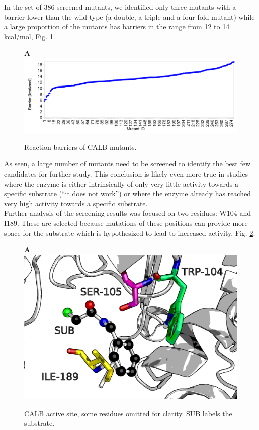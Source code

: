 In the set of 386 screened mutants, we identified only three mutants with a barrier lower than the wild type (a double, a triple and a four-fold mutant) while a large proportion of the mutants has barriers in the range from 12 to 14 kcal/mol, Fig. \ref{fig:reaction-barriers}.
\begin{figure}[htbp] 
\textbf{A}
\includegraphics[width=0.95\linewidth]{barriers.pdf}
\caption{
Reaction barriers of CALB mutants.
}
\label{fig:reaction-barriers}
\end{figure}
As seen, a large number of mutants need to be screened to identify the best few candidates for further study.
This conclusion is likely even more true in studies where the enzyme is either intrinsically of only very little activity towards a specific substrate (``it does not work'') or where the enzyme already has reached very high activity towards a specific substrate\cite{agresti2010ultrahigh}.\\
Further analysis of the screening results was focused on two residues: W104 and I189.
These are selected because mutations of these positions can provide more space for the substrate which is hypothesized to lead to increased activity, Fig. \ref{fig:calb-views}.
\begin{figure}[htbp] 
\textbf{A}
\includegraphics[width=0.95\linewidth]{calb-active-site.png}
\caption{
CALB active site, some residues omitted for clarity.
SUB labels the substrate.
}
\label{fig:calb-views}
\end{figure}
